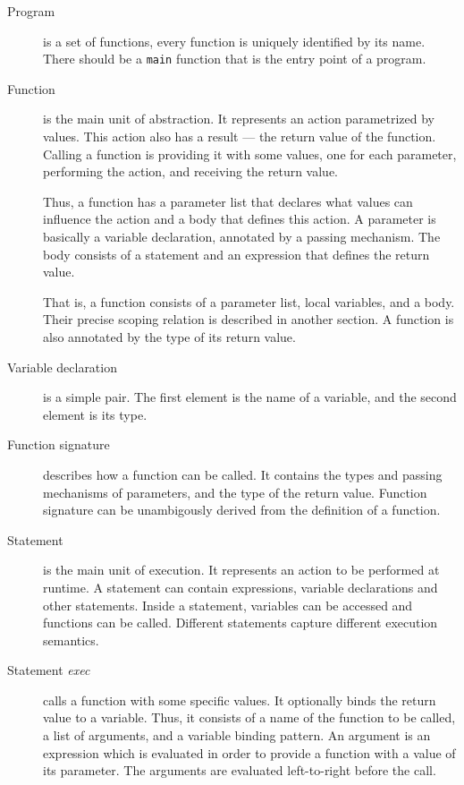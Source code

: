 \documentclass [a4paper] {article}
\begin{document}
\begin {description}

\item [Program] is a set of functions, every function is uniquely identified by
its name. There should be a \texttt{main} function that is the entry point of a
program.

\item [Function] is the main unit of abstraction. It represents an action
parametrized by values. This action also has a result --- the return value of
the function. Calling a function is providing it with some values, one for each
parameter, performing the action, and receiving the return value.

Thus, a function has a parameter list that declares what values can influence
the action and a body that defines this action. A parameter is basically a
variable declaration, annotated by a passing mechanism. The body consists of a
statement and an expression that defines the return value.

That is, a function consists of a parameter list, local variables, and a body.
Their precise scoping relation is described in another section. A function is
also annotated by the type of its return value.

\item [Variable declaration] is a simple pair. The first element is the name
of a variable, and the second element is its type.

\item [Function signature] describes how a function can be called. It contains
the types and passing mechanisms of parameters, and the type of the return
value. Function signature can be unambigously derived from the definition of a
function.

\item [Statement] is the main unit of execution. It represents an action to be
performed at runtime. A statement can contain expressions, variable declarations
and other statements. Inside a statement, variables can be accessed and
functions can be called. Different statements capture different execution
semantics.

\item [Statement \emph{exec}] calls a function with some specific values. It
optionally binds the return value to a variable. Thus, it consists of a name of
the function to be called, a list of arguments, and a variable binding pattern.
An argument is an expression which is evaluated in order to provide a function
with a value of its parameter. The arguments are evaluated left-to-right before
the call.


\end{description}
\end{document}
